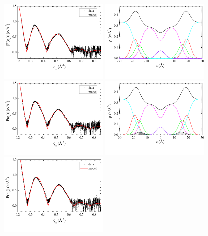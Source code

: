 \begin{figure}[htbp]
  \centering
  \includegraphics[trim=5 30 0 0,clip=true,width=0.47\textwidth]{figures/Tat/SDP_Results/XFF/DOPCDOPE1to1_XFF1}
  \includegraphics[trim=5 30 0 0,clip=true,width=0.47\textwidth]{figures/Tat/SDP_Results/EDP/DOPCDOPE1to1_EDP1}
  \includegraphics[trim=5 30 0 0,clip=true,width=0.47\textwidth]{figures/Tat/SDP_Results/XFF/DOPCDOPE1to1_Tat_62to1_3p0_XFF1}
  \includegraphics[trim=5 30 0 0,clip=true,width=0.47\textwidth]{figures/Tat/SDP_Results/EDP/DOPCDOPE1to1_Tat_62to1_3p0_EDP1}
  \includegraphics[trim=5 30 0 0,clip=true,width=0.47\textwidth]{figures/Tat/SDP_Results/XFF/DOPCDOPE1to1_Tat_28to1_3p0_XFF1}

\end{figure}
